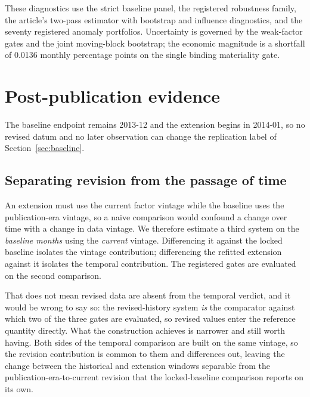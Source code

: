 \documentclass[11pt]{article}
\begin{document}
These diagnostics use the strict baseline panel, the registered robustness
family, the article's two-pass estimator with bootstrap and influence
diagnostics, and the seventy registered anomaly portfolios. Uncertainty is
governed by the weak-factor gates and the joint moving-block bootstrap; the
economic magnitude is a shortfall of 0.0136 monthly percentage points on the %
single binding materiality gate. %

\section{Post-publication evidence}
\label{sec:temporal}

The baseline endpoint remains 2013-12 and the extension begins in 2014-01, so no %
revised datum and no later observation can change the replication label of
Section~\ref{sec:baseline}. %

\subsection{Separating revision from the passage of time}

An extension must use the current factor vintage while the baseline uses the
publication-era vintage, so a naive comparison would confound a change over time
with a change in data vintage. We therefore estimate a third system on the
\emph{baseline months} using the \emph{current} vintage. Differencing it against
the locked baseline isolates the vintage contribution; differencing the refitted
extension against it isolates the temporal contribution. The registered gates are
evaluated on the second comparison.

That does not mean revised data are absent from the temporal verdict, and it
would be wrong to say so: the revised-history system \emph{is} the comparator
against which two of the three gates are evaluated, so revised values enter the
reference quantity directly. What the construction achieves is narrower and
still worth having. Both sides of the temporal comparison are built on the same
vintage, so the revision contribution is common to them and differences out, leaving
the change between the historical and extension windows separable from the
publication-era-to-current revision that the locked-baseline comparison reports
on its own.
\end{document}
